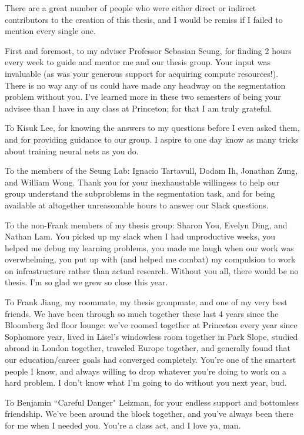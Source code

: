 There are a great number of people who were either direct or indirect contributors to the creation of this thesis, and I would be remiss if I failed to mention every single one.

First and foremost, to my adviser Professor Sebasian Seung, for finding 2 hours every week to guide and mentor me and our thesis group. Your input was invaluable (as was your generous support for acquiring compute resources!). There is no way any of us could have made any headway on the segmentation problem without you. I've learned more in these two semesters of being your advisee than I have in any class at Princeton; for that I am truly grateful.

To Kisuk Lee, for knowing the answers to my questions before I even asked them, and for providing guidance to our group. I aspire to one day know as many tricks about training neural nets as you do.

To the members of the Seung Lab: Ignacio Tartavull, Dodam Ih, Jonathan Zung, and William Wong. Thank you for your inexhaustable willingess to help our group understand the subproblems in the segmentation task, and for being available at altogether unreasonable hours to answer our Slack questions.

To the non-Frank members of my thesis group: Sharon You, Evelyn Ding, and Nathan Lam. You picked up my slack when I had unproductive weeks, you helped me debug my learning problems, you made me laugh when our work was overwhelming, you put up with (and helped me combat) my compulsion to work on infrastructure rather than actual research. Without you all, there would be no thesis. I'm so glad we grew so close this year.

To Frank Jiang, my roommate, my thesis groupmate, and one of my very best friends. We have been through so much together these last 4 years since the Bloomberg 3rd floor lounge: we've roomed together at Princeton every year since Sophomore year, lived in Lisel's windowless room together in Park Slope, studied abroad in London together, traveled Europe together, and generally found that our education/career goals had converged completely. You're one of the smartest people I know, and always willing to drop whatever you're doing to work on a hard problem. I don't know what I'm going to do without you next year, bud.

To Benjamin ``Careful Danger" Leizman, for your endless support and bottomless friendship. We've been around the block together, and you've always been there for me when I needed you. You're a class act, and I love ya, man.

